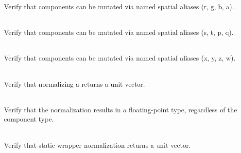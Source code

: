 \begin{DoxyRefList}
\label{test__test000008}%
%
Verify that  components can be mutated via named spatial aliases (r, g, b, a).  
\item[{\parbox[t]{\linewidth}{Member \doxylink{group___f_g_m___vec4___mutation_gaab414c5736d189c56f3d2a75f0bc992a}{Vector4\+DMutation\+\_\+\+Elements\+Can\+Be\+Mutated\+Using\+STPQ} ()}}]\hfill \\
\label{test__test000007}%
%
Verify that  components can be mutated via named spatial aliases (s, t, p, q).  
\item[{\parbox[t]{\linewidth}{Member \doxylink{group___f_g_m___vec4___mutation_ga19dec249204a949eae9b91080cb21d24}{Vector4\+DMutation\+\_\+\+Elements\+Can\+Be\+Mutated\+Using\+XYZW} ()}}]\hfill \\
\label{test__test000006}%
%
Verify that  components can be mutated via named spatial aliases (x, y, z, w).  
\item[{\parbox[t]{\linewidth}{Member \doxylink{group___f_g_m___vec4___normalize_ga7dd3baea55662b88b6ed3e1dec941b0e}{Vector4\+DNormalization\+\_\+\+Non\+Zero\+Vector\+Normalization\+Returns\+Unit\+Vector} ()}}]\hfill \\
\label{test__test000116}%
%
Verify that normalizing a  returns a unit vector.  
\item[{\parbox[t]{\linewidth}{Member \doxylink{group___f_g_m___vec4___normalize_gac9f8c510ad76efdf35425d566bcb2fed}{Vector4\+DNormalization\+\_\+\+Normalized\+Vector\+Is\+Always\+Typed\+Promoted\+To\+Floating\+Point\+Type} ()}}]\hfill \\
\label{test__test000118}%
%
Verify that the  normalization results in a floating-\/point type, regardless of the component type.  
\item[{\parbox[t]{\linewidth}{Member \doxylink{group___f_g_m___vec4___normalize_gab9d71c1663e1936cab9d0e4f188219ce}{Vector4\+DNormalization\+\_\+\+Static\+Wrapper\+\_\+\+Non\+Zero\+Vector\+Normalization\+Returns\+Unit\+Vector} ()}}]\hfill \\
\label{test__test000117}%
%
Verify that  static wrapper normalization returns a unit vector.  

\end{DoxyRefList}
